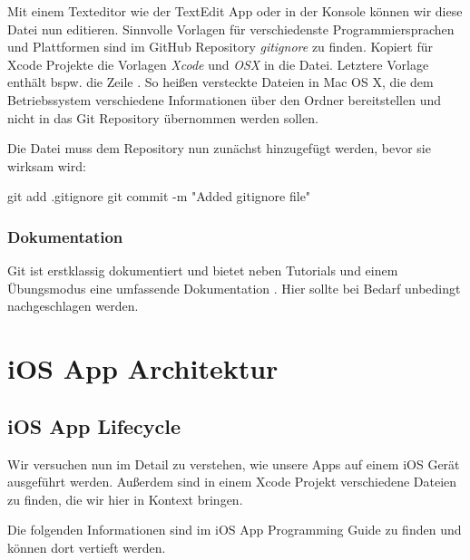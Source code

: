 \documentclass[parskip=half, final]{scrreprt}
\begin{document}
Mit einem Texteditor wie der TextEdit App oder  in der Konsole können wir diese Datei nun editieren. Sinnvolle Vorlagen für verschiedenste Programmiersprachen und Plattformen sind im GitHub Repository \emph{gitignore}  zu finden. Kopiert für Xcode Projekte die Vorlagen \emph{Xcode}  und \emph{OSX}  in die  Datei. Letztere Vorlage enthält bspw. die Zeile . So heißen versteckte Dateien in Mac OS X, die dem Betriebssystem verschiedene Informationen über den Ordner bereitstellen  und nicht in das Git Repository übernommen werden sollen.

Die  Datei muss dem Repository nun zunächst hinzugefügt werden, bevor sie wirksam wird:

\begin{shcode}
git add .gitignore
git commit -m "Added gitignore file"
\end{shcode}

\subsection{Dokumentation}\label{sec:git_doku}

Git  ist erstklassig dokumentiert und bietet neben Tutorials und einem Übungsmodus  eine umfassende Dokumentation . Hier sollte bei Bedarf unbedingt nachgeschlagen werden.



\chapter{iOS App Architektur}


\section{iOS App Lifecycle}

Wir versuchen nun im Detail zu verstehen, wie unsere Apps auf einem iOS Gerät ausgeführt werden. Außerdem sind in einem Xcode Projekt verschiedene Dateien zu finden, die wir hier in Kontext bringen.

Die folgenden Informationen sind im iOS App Programming Guide  zu finden und können dort vertieft werden.
\end{document}
